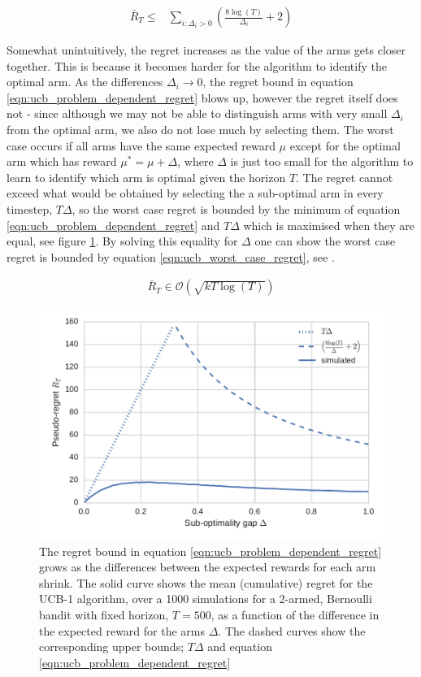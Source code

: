 \documentclass[11pt,a4paper,twoside]{report}
\newcommand{\eqn}[1]{\begin{align}#1\end{align}}
\newcommand{\bigo}[1]{\mathcal{O}\left( #1 \right)}
\newcommand{\regret}{\bar{R}_{T}} %
\theoremstyle{plain}
\theoremstyle{definition}
\begin{document}
\eqn {
\label{eqn:ucb_problem_dependent_regret}
\regret \leq & \sum_{i:\Delta_i > 0}\left(\frac{8\log(T)}{\Delta_i}+2 \right)
}

Somewhat unintuitively, the regret increases as the value of the arms gets closer together. This is because it becomes harder for the algorithm to identify the optimal arm. As the differences $\Delta_i \rightarrow 0$, the regret bound in equation \ref{eqn:ucb_problem_dependent_regret} blows up, however the regret itself does not - since although we may not be able to distinguish arms with very small $\Delta_i$ from the optimal arm, we also do not lose much by selecting them. The worst case occurs if all arms have the same expected reward $\mu$ except for the optimal arm which has reward $\mu^*=\mu+\Delta$, where $\Delta$ is just too small for the algorithm to learn to identify which arm is optimal given the horizon $T$. The regret cannot exceed what would be obtained by selecting the a sub-optimal arm in every timestep, $T\Delta$, so the worst case regret is bounded by the minimum of equation \ref{eqn:ucb_problem_dependent_regret} and $T\Delta$ which is maximised when they are equal, see figure \ref{fig:ucb_regret_vs_delta}. By solving this equality for $\Delta$ one can show the worst case regret is bounded by equation \ref{eqn:ucb_worst_case_regret}, see \citet{Bubeck2012}.

\eqn{
\label{eqn:ucb_worst_case_regret}
\regret \in \bigo{\sqrt{kT\log(T)}}
}  

\begin{figure}
\includegraphics[scale=1]{ucb_regret_vs_delta}
\caption{The regret bound in equation \ref{eqn:ucb_problem_dependent_regret} grows as the differences between the expected rewards for each arm shrink. The solid curve shows the mean (cumulative) regret for the UCB-1 algorithm, over a 1000 simulations for a 2-armed, Bernoulli bandit with fixed horizon, $T = 500$, as a function of the difference in the expected reward for the arms $\Delta$. The dashed curves show the corresponding upper bounds; $T\Delta$ and equation \ref{eqn:ucb_problem_dependent_regret}}
\label{fig:ucb_regret_vs_delta}
\end{figure}
\end{document}
